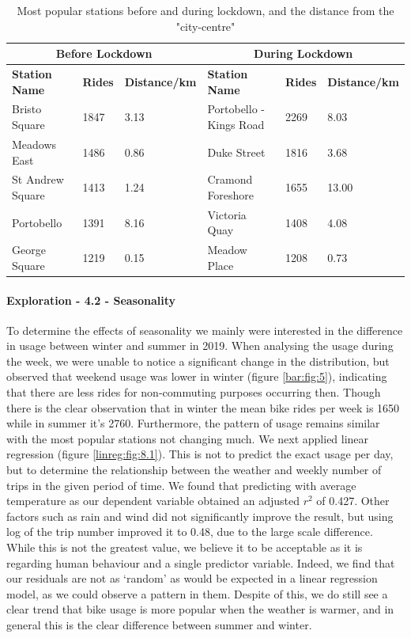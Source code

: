 \documentclass[11pt,a4paper]{article}
\begin{document}
\begin{table}[H]
\caption{Most popular stations before and during lockdown, and the distance from the "city-centre"}
\centering
\label{station:table:1}
\begin{tabular}{llllll}
\toprule
\hline
\multicolumn{3}{c}{\textbf{Before Lockdown}} & \multicolumn{3}{c}{\textbf{During Lockdown}}    \\ \midrule
\hline
\textbf{Station Name} & \textbf{Rides} & \textbf{Distance/km} & \textbf{Station Name}   & \textbf{Rides} & \textbf{Distance/km} \\
Bristo Square     & 1847       & 3.13        & Portobello - Kings Road & 2269       & 8.03     \\
Meadows East      & 1486       & 0.86        & Duke Street             & 1816       & 3.68     \\
St Andrew Square  & 1413       & 1.24        & Cramond Foreshore       & 1655       & 13.00    \\
Portobello        & 1391       & 8.16        & Victoria Quay           & 1408       & 4.08     \\
George Square     & 1219       & 0.15        & Meadow Place            & 1208       & 0.73     \\ \bottomrule
\hline
\end{tabular}
\end{table}



\paragraph{Exploration - 4.2 - Seasonality}

To determine the effects of seasonality we mainly were interested in the difference in usage between winter and summer in 2019. When analysing the usage during the week, we were unable to notice a significant change in the distribution, but observed that weekend usage was lower in winter (figure \ref{bar:fig:5}), indicating that there are less rides for non-commuting purposes occurring then. Though there is the clear observation that in winter the mean bike rides per week is 1650 while in summer it’s 2760. Furthermore, the pattern of usage remains similar with the most popular stations not changing much. We next applied linear regression (figure \ref{linreg:fig:8.1}). This is not to predict the exact usage per day, but to determine the relationship between the weather and weekly number of trips in the given period of time. We found that predicting with average temperature as our dependent variable  obtained an adjusted $r^2$ of 0.427. Other factors such as rain and wind did not significantly improve the result, but using log of the trip number improved it to 0.48, due to the large scale difference. While this is not the greatest value, we believe it to be acceptable as it is regarding human behaviour and a single predictor variable. Indeed, we find that our residuals are not as ‘random’ as would be expected in a linear regression model, as we could observe a pattern in them. Despite of this, we do still see a clear trend that bike usage is more popular when the weather is warmer, and in general this is the clear difference between summer and winter.
\end{document}

